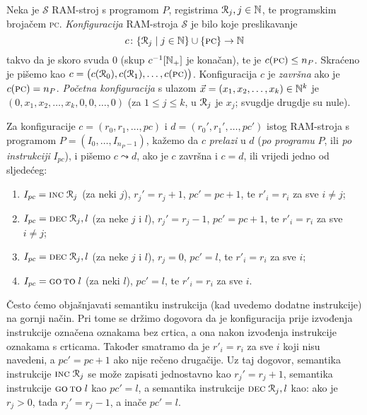 \begin{definicija}[{name=[RAM-konfiguracije i prijelazi među njima]}]\label{def:RAMconf}
Neka je $\mathcal S$ RAM-stroj s programom $P$, registrima $\mathcal R_{j},j\in{\mathbb N}$, te programskim brojačem \textsc{pc}. \emph{Konfiguracija} RAM-stroja $\mathcal S$ je bilo koje preslikavanje
\begin{equation}
    c\colon\{\mathcal R_{j}\mid j\in{\mathbb N}\}\cup\{\textsc{pc}\}\to{\mathbb N}
\end{equation} takvo da je skoro svuda $0$ (skup $c^{-1}[{\mathbb N}_+]$ je konačan), te je $c(\textsc{pc})\le n_P$. Skraćeno je pišemo kao $c=\bigl(c(\mathcal R_{0}),c(\mathcal R_{1}),\dotsc,c(\textsc{pc})\bigr)$. Konfiguracija $c$ je \emph{završna} ako je $c(\textsc{pc})=n_P$. \emph{Početna konfiguracija} s ulazom $\vec x=(x_1,x_2,\dotsc,x_k)\in{\mathbb N}^k$ je $(0,x_1,x_2,\dotsc,x_k,0,0,\dotsc,0)$ (za $1\le j\le k$, u $\mathcal R_{j}$ je $x_j$; svugdje drugdje su nule).

Za konfiguracije $c=(r_0,r_1,\dotsc,pc)$ i $d=(r_0',r_1',\dotsc,pc')$ istog RAM-stroja s programom $P=(I_0,\dotsc,I_{n_P-1})$, kažemo da $c$ \emph{prelazi} u $d$ (\emph{po programu} $P$, ili \emph{po instrukciji} $I_{pc}$), i pišemo $c\leadsto d$, ako je $c$ završna i $c=d$, ili vrijedi jedno od sljedećeg:
\begin{enumerate}
    \item\label{stav:leadINC}
    $I_{pc}=\textsc{inc}\;\mathcal R_{j}$ (za neki $j$), $r_j'=r_j+1$, $pc'=pc+1$, te $r'_i=r_i$ za sve $i\not=j$;
    \item\label{stav:leadDEC-}
    $I_{pc}=\textsc{dec}\;\mathcal R_{j},l$ (za neke $j$ i $l$),  $r_j'=r_j-1$, $pc'=pc+1$, te $r'_i=r_i$ za sve $i\not=j$;
    \item\label{stav:leadDEC0}
    $I_{pc}=\textsc{dec}\;\mathcal R_{j},l$ (za neke $j$ i $l$), $r_j=0$, $pc'=l$, te $r'_i=r_i$ za sve $i$;
    \item\label{stav:leadGOTO}
    $I_{pc}=\textsc{go\,to}\;l$ (za neki $l$), $pc'=l$, te $r'_i=r_i$ za sve $i$.\qedhere
\end{enumerate}
\end{definicija}

Često ćemo objašnjavati semantiku instrukcija (kad uvedemo dodatne instrukcije) na gornji način. Pri tome se držimo dogovora da je konfiguracija prije izvođenja instrukcije označena oznakama bez crtica, a ona nakon izvođenja instrukcije oznakama s crticama. Također smatramo da je $r'_i=r_i$ za sve $i$ koji nisu navedeni, a $pc'=pc+1$ ako nije rečeno drugačije. Uz taj dogovor, semantika instrukcije $\textsc{inc}\;\mathcal R_{j}$ se može zapisati jednostavno kao $r_j'=r_j+1$, semantika instrukcije $\textsc{go\,to}\;l$ kao $pc'=l$, a semantika instrukcije $\textsc{dec}\;\mathcal R_{j},l$ kao: ako je $r_j>0$, tada $r_j'=r_j-1$, a inače $pc'=l$.

